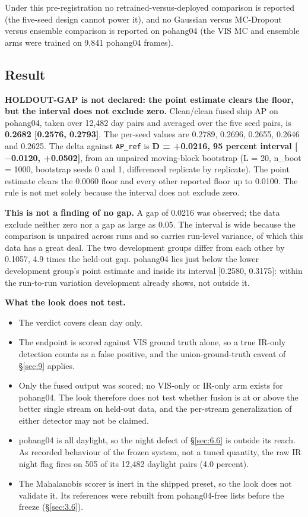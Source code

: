 \documentclass[10pt]{article}
\begin{document}
Under this pre-registration no retrained-versus-deployed comparison is reported (the five-seed design cannot power it), and no Gaussian versus MC-Dropout versus ensemble comparison is reported on pohang04 (the VIS MC and ensemble arms were trained on 9,841 pohang04 frames).

\subsection{Result}\label{sec:7.2}
\textbf{HOLDOUT-GAP is not declared: the point estimate clears the floor, but the interval does not exclude zero.} Clean/clean fused ship AP on pohang04, taken over 12,482 day pairs and averaged over the five seed pairs, is \textbf{0.2682 [0.2576, 0.2793]}. The per-seed values are 0.2789, 0.2696, 0.2655, 0.2646 and 0.2625. The delta against \texttt{AP\_\allowbreak{}ref} is \textbf{D = +0.0216, 95 percent interval [$-$0.0120, +0.0502]}, from an unpaired moving-block bootstrap (L = 20, n\_boot = 1000, bootstrap seeds 0 and 1, differenced replicate by replicate). The point estimate clears the 0.0060 floor and every other reported floor up to 0.0100. The rule is not met solely because the interval does not exclude zero.

\textbf{This is not a finding of no gap.} A gap of 0.0216 was observed; the data exclude neither zero nor a gap as large as 0.05. The interval is wide because the comparison is unpaired across runs and so carries run-level variance, of which this data has a great deal. The two development groups differ from each other by 0.1057, 4.9 times the held-out gap. pohang04 lies just below the lower development group's point estimate and inside its interval [0.2580, 0.3175]: within the run-to-run variation development already shows, not outside it.

\textbf{What the look does not test.}
\begin{itemize}
\item The verdict covers clean day only.
\item The endpoint is scored against VIS ground truth alone, so a true IR-only detection counts as a false positive, and the union-ground-truth caveat of \S\ref{sec:9} applies.
\item Only the fused output was scored; no VIS-only or IR-only arm exists for pohang04. The look therefore does not test whether fusion is at or above the better single stream on held-out data, and the per-stream generalization of either detector may not be claimed.
\item pohang04 is all daylight, so the night defect of \S\ref{sec:6.6} is outside its reach. As recorded behaviour of the frozen system, not a tuned quantity, the raw IR night flag fires on 505 of its 12,482 daylight pairs (4.0 percent).
\item The Mahalanobis scorer is inert in the shipped preset, so the look does not validate it. Its references were rebuilt from pohang04-free lists before the freeze (\S\ref{sec:3.6}).
\end{itemize}
\end{document}
